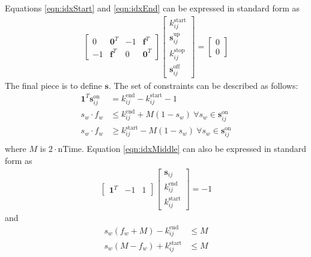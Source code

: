 Equations \ref{eqn:idxStart} and \ref{eqn:idxEnd} can be expressed in standard form as
\begin{equation} \begin{aligned}
	\begin{bmatrix}0 & \mathbf{0}^T & -1 & \mathbf{f}^T \\ -1 & \mathbf{f}^T & 0 & \mathbf{0}^T \end{bmatrix} \begin{bmatrix} k_{ij}^{\text{start}} \\ \mathbf{s}_{ij}^{\text{up}} \\ k_{ij}^{\text{stop}} \\ \mathbf{s}_{ij}^{\text{off}} \end{bmatrix} = \begin{bmatrix}0 \\ 0 \end{bmatrix}
\end{aligned} \end{equation}
The final piece is to define $\mathbf{s}$. The set of constraints can be described as follows: 
\begin{equation} \label{eqn:idxMiddle}\begin{aligned}
	\mathbf{1}^T\mathbf{s}^{\text{on}}_{ij} &= k^{\text{end}}_{ij} - k^{\text{start}}_{ij} - 1 \\
	s_w\cdot f_w &\le k^{\text{end}}_{ij} + M(1 - s_w) \ \forall s_w \in \mathbf{s}^{\text{on}}_{ij}\\
	s_w\cdot f_w &\ge k^{\text{start}}_{ij} - M(1 - s_w) \ \forall s_w \in \mathbf{s}^{\text{on}}_{ij}\\ 
\end{aligned} \end{equation}
where $M$ is $2\cdot\text{nTime}$.
Equation \ref{eqn:idxMiddle} can also be expressed in standard form as
\begin{equation} \begin{aligned}
	\begin{bmatrix}\mathbf{1}^T & - 1 & 1 \end{bmatrix} \begin{bmatrix}\mathbf{s}_{ij} \\ k_{ij}^{\text{end}} \\ k_{ij}^{\text{start}} \end{bmatrix} = -1
\end{aligned} \end{equation}
and
\begin{equation}\begin{aligned}
	s_w\left (f_w + M \right) - k_{ij}^{\text{end}} &\le M \\
	s_w\left (M - f_w\right) + k_{ij}^{\text{start}} &\le M 
\end{aligned}\end{equation}
